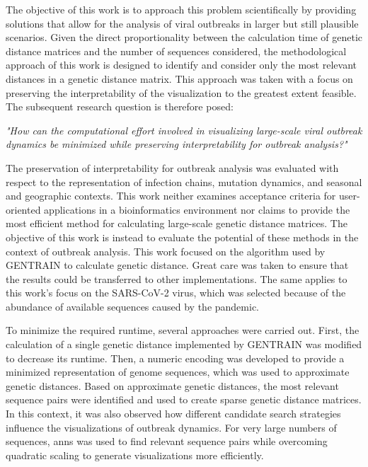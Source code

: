The objective of this work is to approach this problem scientifically by providing solutions that allow for the analysis of viral outbreaks in larger but still plausible scenarios.
Given the direct proportionality between the calculation time of genetic distance matrices and the number of sequences considered, the methodological approach of this work is designed to identify and consider only the most relevant distances in a genetic distance matrix. This approach was taken with a focus on preserving the interpretability of the visualization to the greatest extent feasible.
The subsequent research question is therefore posed: 

\vspace{10pt}
\noindent
\textit{"How can the computational effort involved in visualizing large-scale viral outbreak dynamics be minimized while preserving interpretability for outbreak analysis?"}
\vspace{10pt}

The preservation of interpretability for outbreak analysis was evaluated with respect to the representation of infection chains, mutation dynamics, and seasonal and geographic contexts. This work neither examines acceptance criteria for user-oriented applications in a bioinformatics environment nor claims to provide the most efficient method for calculating large-scale genetic distance matrices. The objective of this work is instead to evaluate the potential of these methods in the context of outbreak analysis.
This work focused on the algorithm used by GENTRAIN to calculate genetic distance. Great care was taken to ensure that the results could be transferred to other implementations. The same applies to this work's focus on the SARS-CoV-2 virus, which was selected because of the abundance of available sequences caused by the pandemic.

To minimize the required runtime, several approaches were carried out. First, the calculation of a single genetic distance implemented by GENTRAIN was modified to decrease its runtime. Then, a numeric encoding was developed to provide a minimized representation of genome sequences, which was used to approximate genetic distances. Based on approximate genetic distances, the most relevant sequence pairs were identified and used to create sparse genetic distance matrices. In this context, it was also observed how different candidate search strategies influence the visualizations of outbreak dynamics. For very large numbers of sequences, \acrlong{anns} was used to find relevant sequence pairs while overcoming quadratic scaling to generate visualizations more efficiently.

